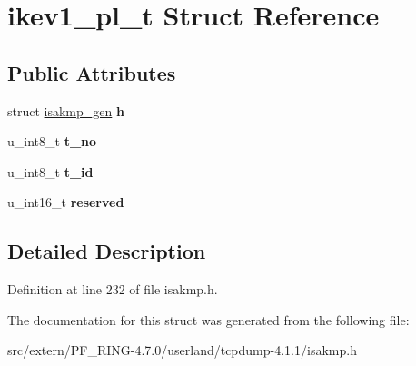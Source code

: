 \hypertarget{structikev1__pl__t}{
\section{ikev1\_\-pl\_\-t Struct Reference}
\label{structikev1__pl__t}
}
\subsection*{Public Attributes}
\begin{DoxyCompactItemize}
\item 
\hypertarget{structikev1__pl__t_ae86120836712d5e4889488889a35ccd1}{
struct \hyperlink{structisakmp__gen}{isakmp\_\-gen} {\bfseries h}}
\label{structikev1__pl__t_ae86120836712d5e4889488889a35ccd1}

\item 
\hypertarget{structikev1__pl__t_a41929c49682c0a6544eaa0940e212c86}{
u\_\-int8\_\-t {\bfseries t\_\-no}}
\label{structikev1__pl__t_a41929c49682c0a6544eaa0940e212c86}

\item 
\hypertarget{structikev1__pl__t_a068fe01d39f18c22d1561c971c50542b}{
u\_\-int8\_\-t {\bfseries t\_\-id}}
\label{structikev1__pl__t_a068fe01d39f18c22d1561c971c50542b}

\item 
\hypertarget{structikev1__pl__t_a3b8dce2d37c409a37f479654ed282087}{
u\_\-int16\_\-t {\bfseries reserved}}
\label{structikev1__pl__t_a3b8dce2d37c409a37f479654ed282087}

\end{DoxyCompactItemize}


\subsection{Detailed Description}


Definition at line 232 of file isakmp.h.



The documentation for this struct was generated from the following file:\begin{DoxyCompactItemize}
\item 
src/extern/PF\_\-RING-\/4.7.0/userland/tcpdump-\/4.1.1/isakmp.h\end{DoxyCompactItemize}

